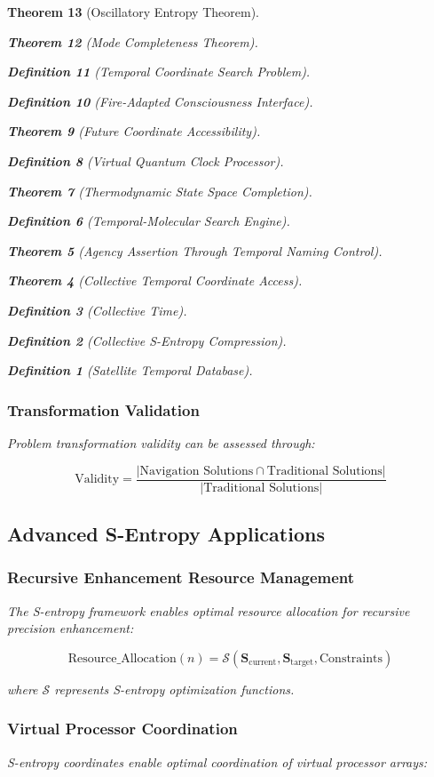 \documentclass[12pt,a4paper]{article}
\newtheorem{theorem}{Theorem}[section]
\newtheorem{definition}[theorem]{Definition}
\begin{document}
\begin{theorem}[Oscillatory Entropy Theorem]
\begin{theorem}[Mode Completeness Theorem]
\begin{enumerate}
\begin{definition}[Temporal Coordinate Search Problem]
\begin{algorithm}
\begin{definition}[Fire-Adapted Consciousness Interface]
\begin{theorem}[Future Coordinate Accessibility]
\begin{definition}[Virtual Quantum Clock Processor]
\begin{itemize}
\begin{itemize}
\begin{theorem}[Thermodynamic State Space Completion]
\begin{definition}[Temporal-Molecular Search Engine]
\begin{theorem}[Agency Assertion Through Temporal Naming Control]
\begin{remark}
\begin{theorem}[Collective Temporal Coordinate Access]
\begin{definition}[Collective Time]
\begin{definition}[Collective S-Entropy Compression]
\begin{definition}[Satellite Temporal Database]
\begin{algorithm}
\begin{table}[h]
{{\subsubsection{Transformation Validation}

Problem transformation validity can be assessed through:

\begin{equation}
\text{Validity} = \frac{|\text{Navigation Solutions} \cap \text{Traditional Solutions}|}{|\text{Traditional Solutions}|}
\label{eq:transformation_validity}
\end{equation}

\subsection{Advanced S-Entropy Applications}

\subsubsection{Recursive Enhancement Resource Management}

The S-entropy framework enables optimal resource allocation for recursive precision enhancement:

\begin{equation}
\text{Resource\_Allocation}(n) = \mathcal{S}(\mathbf{S}_{\text{current}}, \mathbf{S}_{\text{target}}, \text{Constraints})
\end{equation}

where $\mathcal{S}$ represents S-entropy optimization functions.

\subsubsection{Virtual Processor Coordination}

S-entropy coordinates enable optimal coordination of virtual processor arrays:

}}
\end{table}
\end{algorithm}
\end{definition}
\end{definition}
\end{definition}
\end{theorem}
\end{remark}
\end{theorem}
\end{definition}
\end{theorem}
\end{itemize}
\end{itemize}
\end{definition}
\end{theorem}
\end{definition}
\end{algorithm}
\end{definition}
\end{enumerate}
\end{theorem}
\end{theorem}
\end{document}
